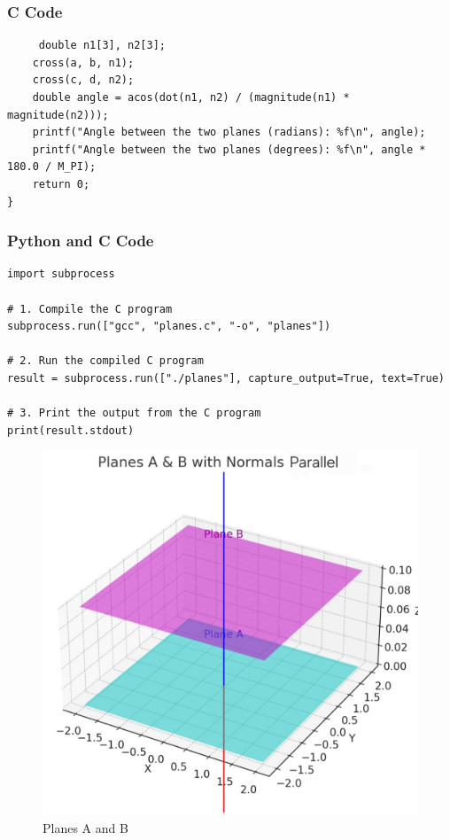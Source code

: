 \documentclass{beamer}
\begin{document}
\begin{frame}[fragile]
\frametitle{C Code}
\begin{lstlisting}
     double n1[3], n2[3];
    cross(a, b, n1);
    cross(c, d, n2);
    double angle = acos(dot(n1, n2) / (magnitude(n1) * magnitude(n2)));
    printf("Angle between the two planes (radians): %f\n", angle);
    printf("Angle between the two planes (degrees): %f\n", angle * 180.0 / M_PI);
    return 0;
}
\end{lstlisting}

\end{frame}

\begin{frame}[fragile]
\frametitle{Python and C Code}

\begin{lstlisting}
import subprocess

# 1. Compile the C program
subprocess.run(["gcc", "planes.c", "-o", "planes"])

# 2. Run the compiled C program
result = subprocess.run(["./planes"], capture_output=True, text=True)

# 3. Print the output from the C program
print(result.stdout)
\end{lstlisting}

\end{frame}
\begin{frame}
\begin{figure}
    \centering
    \includegraphics[width=0.75\columnwidth]{graph .jpg}
    \caption{Planes A and B}
    \label{fig:placeholder}
\end{figure}
\end{frame}
\end{document}
